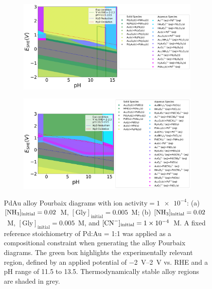 \documentclass[journal=jacsat,manuscript=article]{achemso}
\begin{document}
\begin{figure}[htbp]
    \centering
    \begin{subfigure}[b]{0.45\textwidth}
        \subcaption{}\label{fig:PdAu_Pourbaix_NH3_Gly}
        \includegraphics[width=\textwidth]
        {Figures/alloy_pourbaix_diagrams/Pd_Au_alloy_Pd0.5 Au0.5_NH3=0.02M_Gly=0.005M_CN=0M_activity=1e-04M.png}
        \par\medskip
    \end{subfigure}
    \begin{subfigure}[b]{0.45\textwidth}
        \subcaption{}\label{fig:PdAu_Pourbaix_NH3_Gly_CN}
        \includegraphics[width=\textwidth]{Figures/alloy_pourbaix_diagrams/Pd_Au_alloy_Pd0.5 Au0.5_NH3=0.02M_Gly=0.005M_CN=0.0001M_activity=1e-04M.png}
        \par\medskip   
    \end{subfigure}
    \caption{PdAu alloy Pourbaix diagrams with $\text{ion activity} = \num{1e-4}$: (a) $[\ce{NH3}]_\text{initial} = 0.02$~M, $[\text{Gly}]_\text{initial} = 0.005$~M; (b) $[\ce{NH3}]_\text{initial} = 0.02$~M, $[\text{Gly}]_\text{initial} = 0.005$~M, and $[\ce{CN^-}]_\text{initial} = \num{1e-4}$~M. A fixed reference stoichiometry of Pd:Au = 1:1 was applied as a compositional constraint when generating the alloy Pourbaix diagrams. The green box highlights the experimentally relevant region, defined by an applied potential of \SIrange{-2}{2}{V} vs. RHE and a pH range of 11.5 to 13.5. Thermodynamically stable alloy regions are shaded in grey.}
    \label{fig:PdAu_alloy_Pourbaix}
\end{figure}
\end{document}
